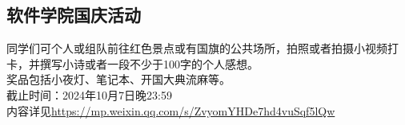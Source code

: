\documentclass[letterpaper, 12pt]{article}
\begin{document}
\begin{multicols}{2}
\section{软件学院国庆活动}
同学们可个人或组队前往红色景点或有国旗的公共场所，拍照或者拍摄小视频打卡，并撰写小诗或者一段不少于100字的个人感想。\\
奖品包括小夜灯、笔记本、开国大典流麻等。\\
截止时间：2024年10月7日晚23:59\\
内容详见\url{https://mp.weixin.qq.com/s/ZvyomYHDe7hd4vuSqf5lQw}


\end{multicols} 
\end{document}
